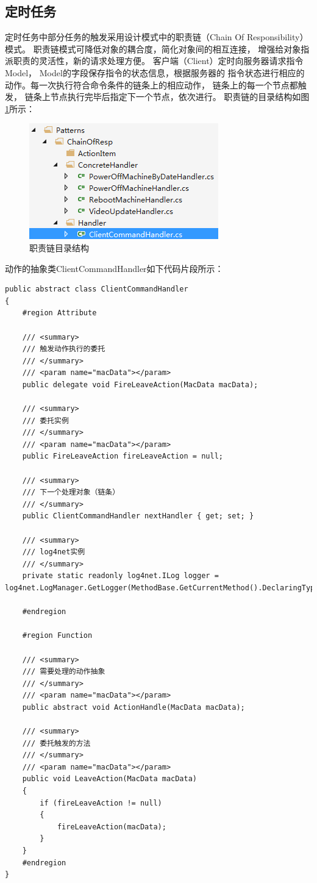 \documentclass{book}
\begin{document}
\subsection{定时任务}

定时任务中部分任务的触发采用设计模式中的职责链（Chain Of Responsibility）模式。
职责链模式可降低对象的耦合度，简化对象间的相互连接，
增强给对象指派职责的灵活性，新的请求处理方便。
客户端（Client）定时向服务器请求指令Model，
Model的字段保存指令的状态信息，根据服务器的
指令状态进行相应的动作。每一次执行符合命令条件的链条上的相应动作，
链条上的每一个节点都触发，
链条上节点执行完毕后指定下一个节点，依次进行。
职责链的目录结构如图\ref{fig:ChainOfResponsibilityContentStructure}所示：

\begin{figure}[htbp]
	\centering
	\includegraphics[scale=1]{ChainOfResponsibilityContentStructure.png}
	\caption{职责链目录结构}
	\label{fig:ChainOfResponsibilityContentStructure}
\end{figure}

动作的抽象类ClientCommandHandler如下代码片段所示：

\begin{lstlisting}
public abstract class ClientCommandHandler
{
	#region Attribute

	/// <summary>
	/// 触发动作执行的委托
	/// </summary>
	/// <param name="macData"></param>
	public delegate void FireLeaveAction(MacData macData);
	
	/// <summary>
	/// 委托实例
	/// </summary>
	/// <param name="macData"></param>
	public FireLeaveAction fireLeaveAction = null;
	
	/// <summary>
	/// 下一个处理对象（链条）
	/// </summary>
	public ClientCommandHandler nextHandler { get; set; }
	
	/// <summary>
	/// log4net实例
	/// </summary>
	private static readonly log4net.ILog logger = log4net.LogManager.GetLogger(MethodBase.GetCurrentMethod().DeclaringType);
	
	#endregion
	
	#region Function
	
	/// <summary>
	/// 需要处理的动作抽象
	/// </summary>
	/// <param name="macData"></param>
	public abstract void ActionHandle(MacData macData);
	
	/// <summary>
	/// 委托触发的方法
	/// </summary>
	/// <param name="macData"></param>
	public void LeaveAction(MacData macData)
	{
	    if (fireLeaveAction != null)
	    {
	        fireLeaveAction(macData);
	    }
	}
	#endregion
}
\end{lstlisting}
\end{document}
